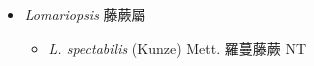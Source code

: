 
  \begin{itemize}
 \item[] \textit{Lomariopsis} 藤蕨屬
                                
  \begin{itemize}
        \item[] \textit{L. spectabilis} (Kunze) Mett.  羅蔓藤蕨   NT
  \end{itemize}
  \end{itemize}
